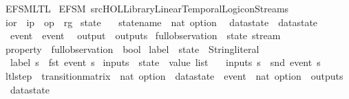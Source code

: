 %
\begin{isabellebody}%
%
%
\isadelimtheory
%
\endisadelimtheory
%
\isatagtheory
{}\isamarkupfalse%
\ EFSM{\isacharunderscore}LTL\isanewline
{}\ {\isachardoublequoteopen}{\isachardot}{\isachardot}{\isacharslash}EFSM{\isachardoublequoteclose}\ {\isachardoublequoteopen}{\isachartilde}{\isachartilde}{\isacharslash}src{\isacharslash}HOL{\isacharslash}Library{\isacharslash}Linear{\isacharunderscore}Temporal{\isacharunderscore}Logic{\isacharunderscore}on{\isacharunderscore}Streams{\isachardoublequoteclose}\isanewline
{}%
\endisatagtheory
{\isafoldtheory}%
%
\isadelimtheory
\isanewline
%
\endisadelimtheory
\isanewline
{}\isamarkupfalse%
\ ior\ {\isacharequal}\ ip\ {\isacharbar}\ op\ {\isacharbar}\ rg\isanewline
\isanewline
{}\isamarkupfalse%
\ state\ {\isacharequal}\isanewline
\ \ statename\ {\isacharcolon}{\isacharcolon}\ {\isachardoublequoteopen}nat\ option{\isachardoublequoteclose}\isanewline
\ \ datastate\ {\isacharcolon}{\isacharcolon}\ datastate\isanewline
\ \ event\ {\isacharcolon}{\isacharcolon}\ event\isanewline
\ \ {\isachardoublequoteopen}output{\isachardoublequoteclose}\ {\isacharcolon}{\isacharcolon}\ outputs\isanewline
\isanewline
{}\isamarkupfalse%
\ full{\isacharunderscore}observation\ {\isacharequal}\ {\isachardoublequoteopen}state\ stream{\isachardoublequoteclose}\isanewline
{}\isamarkupfalse%
\ property\ {\isacharequal}\ {\isachardoublequoteopen}full{\isacharunderscore}observation\ {\isasymRightarrow}\ bool{\isachardoublequoteclose}\isanewline
\isanewline
{}\isamarkupfalse%
\ label\ {\isacharcolon}{\isacharcolon}\ {\isachardoublequoteopen}state\ {\isasymRightarrow}\ String{\isachardot}literal{\isachardoublequoteclose}\ \isanewline
\ \ {\isachardoublequoteopen}label\ s\ {\isasymequiv}\ fst\ {\isacharparenleft}event\ s{\isacharparenright}{\isachardoublequoteclose}\isanewline
\isanewline
{}\isamarkupfalse%
\ inputs\ {\isacharcolon}{\isacharcolon}\ {\isachardoublequoteopen}state\ {\isasymRightarrow}\ value\ list{\isachardoublequoteclose}\ \isanewline
\ \ {\isachardoublequoteopen}inputs\ s\ {\isasymequiv}\ snd\ {\isacharparenleft}event\ s{\isacharparenright}{\isachardoublequoteclose}\isanewline
\isanewline
{}\isamarkupfalse%
\ ltl{\isacharunderscore}step\ {\isacharcolon}{\isacharcolon}\ {\isachardoublequoteopen}transition{\isacharunderscore}matrix\ {\isasymRightarrow}\ nat\ option\ {\isasymRightarrow}\ datastate\ {\isasymRightarrow}\ event\ {\isasymRightarrow}\ {\isacharparenleft}nat\ option\ {\isasymtimes}\ outputs\ {\isasymtimes}\ datastate{\isacharparenright}{\isachardoublequoteclose}\ \isanewline

\end{isabellebody}

